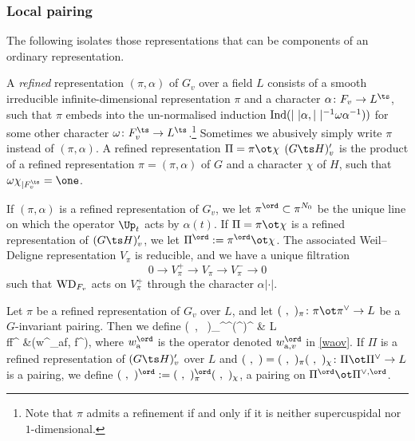 \subsubsection{Local pairing}  The following isolates those representations that can be components of an ordinary representation.
\begin{defi}
\notready{}
A \emph{refined} representation $(\pi, \alpha)$ of $G_{v}$ over a field $L$ consists of  a smooth irreducible infinite-dimensional representation $\pi$ and   a character $\alpha\colon F_{v}\to L^{\ts}$, such that  $\pi$ embeds into  the un-normalised induction ${\rm Ind}( |\ |\alpha , |\ |^{-1}\omega\alpha^{-1}))$ for some  other  character $\omega\colon F_{v}^{\ts}\to L^{\ts}$.\footnote{Note that $\pi$ admits a refinement  if and only if it is neither supercuspidal nor $1$-dimensional.} Sometimes we abusively simply write $\pi$ instead of $(\pi, \alpha)$. A refined   representation $\Pi=\pi\ot \chi$ $(G\ts H)'_{v}$ is the product of a refined representation $\pi=(\pi, \alpha)$ of $G$ and a character $\chi$ of $H$, such that $\omega\chi_{|F_{v}^{\ts}}=\one$.
\end{defi}
If $(\pi, \alpha)$ is a refined representation of $G_{v}$, we let $\pi^{\ord}\subset \pi^{N_{0}}$ be the unique line on which the operator $\Up_{t}$ acts by $\alpha(t)$. If $\Pi=\pi\ot\chi$  is a refined representation of $(G\ts H)'_{v}$, we let $\Pi^{\ord}:=\pi^{\ord}\ot\chi$. The  associated Weil--Deligne representation $V_{\pi}$ is reducible, and we have a unique filtration
$$0\to V_{\pi}^{+}\to V_{\pi} \to V_{\pi}^{-}\to 0$$
such that ${\rm WD}_{F_{v}}$ acts on $V_{\pi}^{+}$ through the character $\alpha|\cdot|$.


Let $\pi$ be a refined  representation of $G_{v}$ over $L$, and let $(\ , \  )_{\pi}\colon \pi\ot \pi^{\vee}\to L$  be a  $G$-invariant   pairing. Then we define
\beqq
(\ , \  )_{\pi}^{\ord}\colon \pi^{\ord}\ot (\pi^{\vee})^{\ord} & \to L \\
f\ot f^{\vee} &\mapsto  (w^{\ord}_{\rm a}f, f^{\vee}),
\eeqq
where $w^{\ord}_{\rm a} $ is the operator denoted  $w_{{\rm a}, v}^{\ord}$ in \eqref{waov}. If $\Pi$ is a refined representation of $(G\ts H)_{v}'$ over $L$ and $(\ , \ ) =(\ , \ )_{\pi}(\ ,\ )_{\chi}\colon \Pi\ot \Pi^{\vee} \to L$ is a pairing, we define  $(\ , \ )^{\ord}:= (\ , \  )_{\pi}^{\ord} (\ ,\ )_{\chi}$, a pairing on $\Pi^{\ord}\ot \Pi^{\vee, \ord}$.





